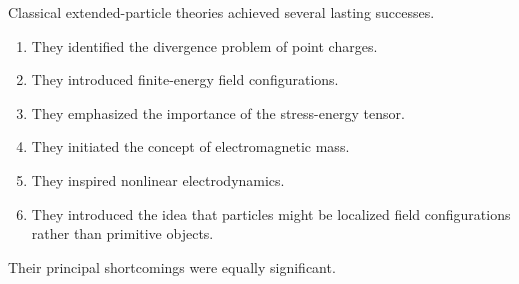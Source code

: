 Classical extended-particle theories achieved several lasting successes.

\begin{enumerate}

\item They identified the divergence problem of point charges.

\item They introduced finite-energy field configurations.

\item They emphasized the importance of the stress-energy tensor.

\item They initiated the concept of electromagnetic mass.

\item They inspired nonlinear electrodynamics.

\item They introduced the idea that particles might be localized field
configurations rather than primitive objects.

\end{enumerate}

Their principal shortcomings were equally significant.

